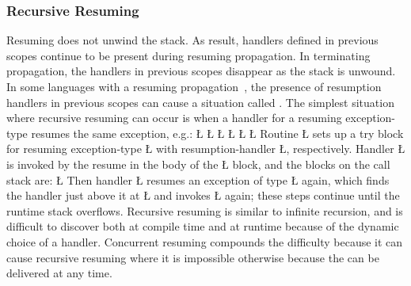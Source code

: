 \documentclass[openright,twoside]{report}
\begin{document}
\subsubsection{Recursive Resuming}
\label{s:RecursiveResuming}

Resuming does not unwind the stack.
As result, handlers defined in previous scopes continue to be present during resuming propagation.
In terminating propagation, the handlers in previous scopes disappear as the stack is unwound.
In some languages with a resuming propagation~\cite{MacLaren77,Buhr92b,ExceptionalC}, the presence of resumption handlers in previous scopes can cause a situation called .
The simplest situation where recursive resuming can occur is when a handler for a resuming exception-type resumes the same exception, e.g.:
\LGinlinefalse\LGbegin\lgrinde
\L{}
\L{}
\L{\LB{}}
\L{\LB{}}
\L{\LB{}}
\CE{}\L{\LB{\}}}
\endlgrinde\LGend
Routine \LGinlinetrue\LGbegin\lgrinde\L{}\endlgrinde\LGend{} sets up a try block for resuming exception-type \LGinlinetrue\LGbegin\lgrinde\L{}\endlgrinde\LGend{} with resumption-handler \LGinlinetrue\LGbegin\lgrinde\L{}\endlgrinde\LGend{}, respectively.
Handler \LGinlinetrue\LGbegin\lgrinde\L{}\endlgrinde\LGend{} is invoked by the resume in the body of the \LGinlinetrue\LGbegin\lgrinde\L{}\endlgrinde\LGend{} block, and the blocks on the call stack are:
\LGinlinefalse\LGbegin\lgrinde
\L{}
\endlgrinde\LGend
Then handler \LGinlinetrue\LGbegin\lgrinde\L{}\endlgrinde\LGend{} resumes an exception of type \LGinlinetrue\LGbegin\lgrinde\L{}\endlgrinde\LGend{} again, which finds the handler just above it at \LGinlinetrue\LGbegin\lgrinde\L{}\endlgrinde\LGend{} and invokes \LGinlinetrue\LGbegin\lgrinde\L{}\endlgrinde\LGend{} again;
these steps continue until the runtime stack overflows.
Recursive resuming is similar to infinite recursion, and is difficult to discover both at compile time and at runtime because of the dynamic choice of a handler.
Concurrent resuming compounds the difficulty because it can cause recursive resuming where it is impossible otherwise because the  can be delivered at any time.
\end{document}
